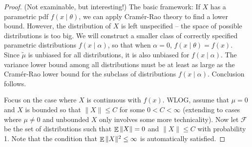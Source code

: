 \documentclass[10pt]{article}
\begin{document}
\begin{proof}
	(Not examinable, but interesting!) The basic framework: If $X$ has a parametric pdf $f(x \mid \theta)$, we can apply Cram\'{e}r-Rao theory to find a lower bound. However, the distribution of $X$ is left unspecified -- the space of possible distributions is too big. We will construct a smaller class of correctly specified parametric distributions $f(x \mid \alpha)$, so that when $\alpha = 0$, $f(x \mid \theta) = f(x)$. Since $\tilde{\mu}$ is unbiased for all distributions, it is also unbiased for $f(x \mid \alpha)$. The variance lower bound among all distributions must be at least as large as the Cram\'{e}r-Rao lower bound for the subclass of distributions $f(x \mid \alpha)$. Conclusion follows.
	
	Focus on the case where $X$ is continuous with $f(x)$. WLOG, assume that $\mu = 0$ and $X$ is bounded so that $\|X\| \le C$ for some $0 < C < \infty$ (extending to cases where $\mu \ne 0$ and unbounded $X$ only involves some more technicality). Now let $\mathcal{F}$ be the set of distributions such that $\mathop{\mathbb{E}} \|X\| = 0$ and $\|X\| \le C$ with probability 1. Note that the condition that $\mathop{\mathbb{E}} \|X\|^2 \le \infty$ is automatically satisfied.
	

\end{proof}
\end{document}
